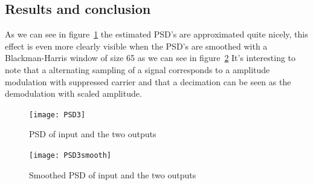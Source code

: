 \documentclass[10pt]{article}
\begin{document}
\subsection{Results and conclusion}

As we can see in figure~\ref{fig:PSD3} the estimated PSD's are approximated
quite nicely, this effect is even more clearly visible when the PSD's are smoothed
with a Blackman-Harris window of size 65 as we can see in figure~\ref{fig:PSD3smooth}
It's interesting to note that a alternating sampling of a signal corresponds to
a amplitude modulation with suppressed carrier and that a decimation can be seen
as the demodulation with scaled amplitude.

\begin{figure}[!hp]

    \begin{center}
      \texttt{[image: PSD3]}
    \caption{PSD of input and the two outputs \label{fig:PSD3}}
    \end{center}

\end{figure}

\begin{figure}[!hp]

    \begin{center}
      \texttt{[image: PSD3smooth]}
    \caption{Smoothed PSD of input and the two outputs\label{fig:PSD3smooth}}
    \end{center}

\end{figure}
\end{document}
